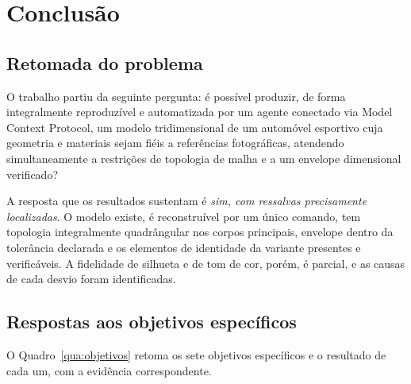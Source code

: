 \chapter{Conclus\~ao}\label{ch:conclusao}

\section{Retomada do problema}

O trabalho partiu da seguinte pergunta: \'e poss\'ivel produzir, de forma integralmente
reproduz\'ivel e automatizada por um agente conectado via Model Context Protocol, um modelo
tridimensional de um autom\'ovel esportivo cuja geometria e materiais sejam fi\'eis a
refer\^encias fotogr\'aficas, atendendo simultaneamente a restri{\c{c}}\~oes de topologia de
malha e a um envelope dimensional verificado?

A resposta que os resultados sustentam \'e \emph{sim, com ressalvas precisamente
localizadas}. O modelo existe, \'e reconstru\'ivel por um \'unico comando, tem topologia
integralmente quadr\^angular nos corpos principais, envelope dentro da toler\^ancia
declarada e os elementos de identidade da variante presentes e verific\'aveis. A
fidelidade de silhueta e de tom de cor, por\'em, \'e parcial, e as causas de cada
desvio foram identificadas.

\section{Respostas aos objetivos espec\'ificos}

O Quadro~\ref{qua:objetivos} retoma os sete objetivos espec\'ificos e o resultado de cada
um, com a evid\^encia correspondente.

